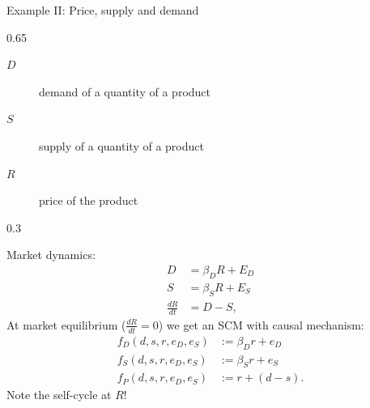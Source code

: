 \begin{frame}{Example II: Price, supply and demand}
  \begin{topalignedcolumn}{0.65\linewidth}
  \begin{description}
     \item[$D$] demand of a quantity of a product
     \item[$S$] supply of a quantity of a product
     \item[$R$] price of the product
  \end{description}
  \end{topalignedcolumn}\hfill%
  \begin{topalignedcolumn}{0.3\linewidth}
  \end{topalignedcolumn}

  \medskip
  Market dynamics:
$$\begin{aligned}
    D &= \beta_D R + E_D \\
    S &= \beta_S R + E_S \\
    \frac{dR}{dt} &= D - S,
  \end{aligned}$$
  At market equilibrium ($\frac{dR}{dt}=0$) we get an SCM with causal mechanism:
$$
  \begin{aligned}
    f_D(d,s,r,e_D,e_S) &:= \beta_D r + e_D \\
    f_S(d,s,r,e_D,e_S) &:= \beta_S r + e_S \\
    f_P(d,s,r,e_D,e_S) &:= r + (d - s).
  \end{aligned}
$$
  Note the self-cycle at $R$!
\end{frame}

